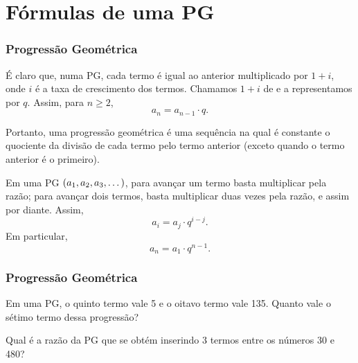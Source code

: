 \documentclass[brazil, notheorems, 10pt]{beamer}
\begin{document}
\section{Fórmulas de uma PG}
\begin{frame}
\frametitle{Progressão Geométrica} %

É claro que, numa PG, cada termo é igual ao anterior multiplicado por
$1 + i$, onde $i$ é a taxa de crescimento dos termos. Chamamos $1+i$
de  e a representamos por $q$. Assim, para
$n \geq 2$, $$a_n = a_{n-1} \cdot q.$$

Portanto, uma progressão geométrica é uma sequência na qual é
constante o quociente da divisão de cada termo pelo termo anterior
(exceto quando o termo anterior é o primeiro). \pause


Em uma PG $\left(a_1, a_2, a_3 , \dots\right)$, para avançar um termo
basta multiplicar pela razão; para avançar dois termos, basta
multiplicar duas vezes pela razão, e assim por diante. Assim, $$a_i
= a_j \cdot q^{i-j}.$$ Em particular,
$$a_n = a_1\cdot q^{n-1}.$$

\end{frame}


\begin{frame}
\frametitle{Progressão Geométrica} %

\begin{Exem}
Em uma PG, o quinto termo vale 5 e o oitavo termo vale 135. Quanto
vale o sétimo termo dessa progressão?
\end{Exem}

\begin{Exem}
Qual é a razão da PG que se obtém inserindo 3 termos entre os
números 30 e 480?
\end{Exem}

\end{frame}

\end{document}
